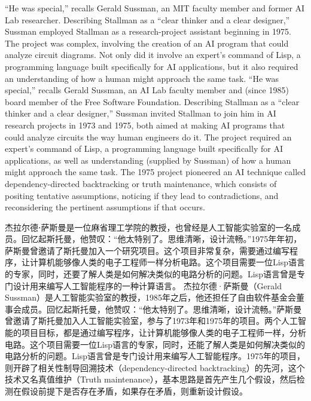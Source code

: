 \ifdefined\eng
\ifdefined\vone
``He was special,'' recalls Gerald Sussman, an MIT faculty member and former AI Lab researcher. Describing Stallman as a ``clear thinker and a clear designer,'' Sussman employed Stallman as a research-project assistant beginning in 1975. The project was complex, involving the creation of an AI program that could analyze circuit diagrams. Not only did it involve an expert's command of Lisp, a programming language built specifically for AI applications, but it also required an understanding of how a human might approach the same task.
\fi
\ifdefined\vtwo
``He was special,'' recalls Gerald Sussman, an AI Lab faculty member and (since 1985) board member of the Free Software Foundation. Describing Stallman as a ``clear thinker and a clear designer,'' Sussman invited Stallman to join him in AI research projects in 1973 and 1975, both aimed at making AI programs that could analyze circuits the way human engineers do it. The project required an expert's command of Lisp, a programming language built specifically for AI applications, as well as understanding (supplied by Sussman) of how a human might approach the same task.  The 1975 project pioneered an AI technique called dependency-directed backtracking or truth maintenance, which consists of positing tentative assumptions, noticing if they lead to contradictions, and reconsidering the pertinent assumptions if that occurs.
\fi
\fi

\ifdefined\chs
\ifdefined\vone
杰拉尔德⋅萨斯曼是一位麻省理工学院的教授，也曾经是人工智能实验室的一名成员。回忆起斯托曼，他赞叹：``他太特别了。思维清晰，设计流畅。''1975年年初，萨斯曼曾邀请了斯托曼加入一个研究项目。这个项目非常复杂，需要通过编写程序，让计算机能够像人类的电子工程师一样分析电路。这个项目需要一位Lisp语言的专家，同时，还要了解人类是如何解决类似的电路分析的问题。Lisp语言曾是专门设计用来编写人工智能程序的一种计算语言。
\fi
\ifdefined\vtwo
杰拉尔德·萨斯曼（Gerald Sussman）是人工智能实验室的教授，1985年之后，他还担任了自由软件基金会董事会成员。回忆起斯托曼，他赞叹：``他太特别了。思维清晰，设计流畅。''萨斯曼曾邀请了斯托曼加入人工智能实验室，参与了1973年和1975年的项目。两个人工智能的项目目标，都是通过编写程序，让计算机能够像人类的电子工程师一样，分析电路。这个项目需要一位Lisp语言的专家，同时，还能了解人类是如何解决类似的电路分析的问题。Lisp语言曾是专门设计用来编写人工智能程序。1975年的项目，则开辟了相关性制导回溯技术（dependency-directed backtracking）的先河，这个技术又名真值维护（Truth maintenance），基本思路是首先产生几个假设，然后检测在假设前提下是否存在矛盾，如果存在矛盾，则重新设计假设。
\fi
\fi

